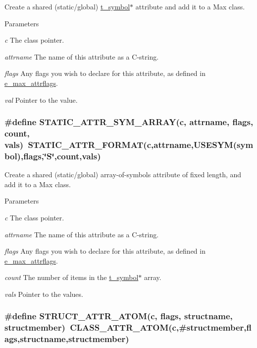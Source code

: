 Create a shared (static/global) \hyperlink{structt__symbol}{t\_\-symbol}$\ast$ attribute and add it to a Max class. 
\begin{DoxyParams}{Parameters}
\item[{\em c}]The class pointer. \item[{\em attrname}]The name of this attribute as a C-\/string. \item[{\em flags}]Any flags you wish to declare for this attribute, as defined in \hyperlink{group__attr_gaf296cfc6741bb19207f6ed8062809115}{e\_\-max\_\-attrflags}. \item[{\em val}]Pointer to the value. \end{DoxyParams}
\hypertarget{group__attr_ga2e42ccd99f08c560894542e53b29e313}{
\subsubsection[{STATIC\_\-ATTR\_\-SYM\_\-ARRAY}]{\setlength{\rightskip}{0pt plus 5cm}\#define STATIC\_\-ATTR\_\-SYM\_\-ARRAY(c, \/  attrname, \/  flags, \/  count, \/  vals)~STATIC\_\-ATTR\_\-FORMAT(c,attrname,USESYM(symbol),flags,\char`\"{}S\char`\"{},count,vals)}}
\label{group__attr_ga2e42ccd99f08c560894542e53b29e313}


Create a shared (static/global) array-\/of-\/symbols attribute of fixed length, and add it to a Max class. 
\begin{DoxyParams}{Parameters}
\item[{\em c}]The class pointer. \item[{\em attrname}]The name of this attribute as a C-\/string. \item[{\em flags}]Any flags you wish to declare for this attribute, as defined in \hyperlink{group__attr_gaf296cfc6741bb19207f6ed8062809115}{e\_\-max\_\-attrflags}. \item[{\em count}]The number of items in the \hyperlink{structt__symbol}{t\_\-symbol}$\ast$ array. \item[{\em vals}]Pointer to the values. \end{DoxyParams}
\hypertarget{group__attr_gac3eb53c213e4ab85625f9e4e10b20521}{
\subsubsection[{STRUCT\_\-ATTR\_\-ATOM}]{\setlength{\rightskip}{0pt plus 5cm}\#define STRUCT\_\-ATTR\_\-ATOM(c, \/  flags, \/  structname, \/  structmember)~CLASS\_\-ATTR\_\-ATOM(c,\#structmember,flags,structname,structmember)}}
\label{group__attr_gac3eb53c213e4ab85625f9e4e10b20521}


